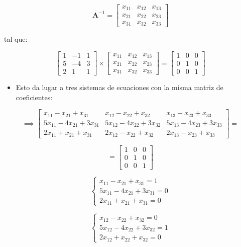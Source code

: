 \documentclass[]{book}
\providecommand{\tightlist}{%
  \setlength{\itemsep}{0pt}\setlength{\parskip}{0pt}}
\begin{document}
\[
\mathbf{A}^{-1} =
\begin{bmatrix}
x_{11} & x_{12} & x_{13} \\
x_{21} & x_{22} & x_{23} \\
x_{31} & x_{32} & x_{33} 
\end{bmatrix}
\]

tal que:

\[
\begin{bmatrix}
1 & -1 & 1 \\
5 & -4 & 3 \\
2 & 1 & 1 
\end{bmatrix}
\times
\begin{bmatrix}
x_{11} & x_{12} & x_{13} \\
x_{21} & x_{22} & x_{23} \\
x_{31} & x_{32} & x_{33} 
\end{bmatrix}
=
\begin{bmatrix}
1 & 0 & 0 \\
0 & 1 & 0 \\
0 & 0 & 1 
\end{bmatrix}
\]

\begin{itemize}
\tightlist
\item
  Esto da lugar a tres sistemas de ecuaciones con la misma matriz de coeficientes:
\end{itemize}

\[
\implies
\begin{bmatrix}
x_{11}-x_{21}+x_{31} & x_{12}-x_{22}+x_{32} & x_{13}-x_{23}+x_{33} \\
5x_{11}-4x_{21}+3x_{31} & 5x_{12}-4x_{22}+3x_{32} & 5x_{13}-4x_{23}+3x_{33} \\
2x_{11}+x_{21}+x_{31} & 2x_{12}-x_{22}+x_{32} & 2x_{13}-x_{23}+x_{33} 
\end{bmatrix}
=
\]

\[
=
\begin{bmatrix}
1 & 0 & 0 \\
0 & 1 & 0 \\
0 & 0 & 1 
\end{bmatrix}
\]

\[
\begin{cases} 
x_{11}-x_{21}+x_{31}=1 \\
5x_{11}-4x_{21}+3x_{31}=0 \\
2x_{11}+x_{21}+x_{31}=0
\end{cases}
\]

\[
\begin{cases} 
x_{12}-x_{22}+x_{32}=0 \\
5x_{12}-4x_{22}+3x_{32}=1 \\
2x_{12}+x_{22}+x_{32}=0
\end{cases}
\]
\end{document}
